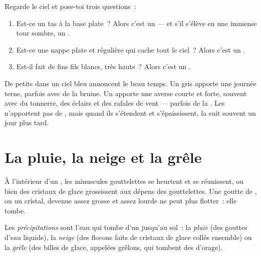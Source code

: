 \begin{method}\label{met:g4:clouds-rain-snow:naming}
Regarde le ciel et pose-toi trois questions~:
\begin{enumerate}
  \item Est-ce un tas à la base plate~? Alors c'est un  --- et s'il
        s'élève en une immense tour sombre, un .
  \item Est-ce une nappe plate et régulière qui cache tout le ciel~? Alors
        c'est un .
  \item Est-il fait de fins fils blancs, très hauts~? Alors c'est un .
\end{enumerate}
\end{method}

\begin{remark}\label{rem:g4:clouds-rain-snow:tell}
De petits  dans un ciel bleu annoncent le beau temps. Un 
gris apporte une journée terne, parfois avec de la bruine. Un 
apporte une averse courte et forte, souvent avec du tonnerre, des éclairs
et des rafales de vent --- parfois de la . Les  n'apportent pas
de , mais quand ils s'étendent et s'épaississent, la  suit
souvent un jour plus tard.
\end{remark}

\section{La pluie, la neige et la grêle}

À l'intérieur d'un , les minuscules gouttelettes se heurtent et se
réunissent, ou bien des cristaux de glace grossissent aux dépens des
gouttelettes. Une goutte de , ou un cristal, devenue assez grosse et
assez lourde ne peut plus flotter~: elle tombe.

\begin{definition}[Précipitations]\label{def:g4:clouds-rain-snow:precipitation}
Les \emph{précipitations} sont l'eau
qui tombe d'un  jusqu'au sol~: la \emph{pluie} (des
gouttes d'eau liquide), la \emph{neige} (des flocons faits de
cristaux de glace collés ensemble) ou la \emph{grêle}
(des billes de glace, appelées grêlons, qui tombent des  d'orage).
\end{definition}

